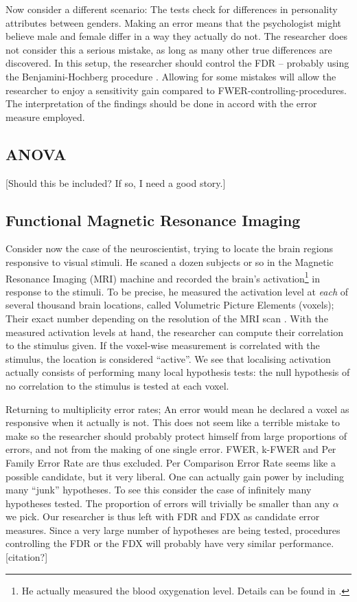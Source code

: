 \documentclass[review,12pt]{article}
\begin{document}
Now consider a different scenario: The tests check for differences in personality attributes between genders. Making an error means that the psychologist might believe male and female differ in a way they actually do not. The researcher does not consider this a serious mistake, as long as many other true differences are discovered. In this setup, the researcher should control the FDR -- probably using the Benjamini-Hochberg procedure \citep{benjamini_controlling_1995}. Allowing for some mistakes will allow the researcher to enjoy a sensitivity gain compared to FWER-controlling-procedures. The interpretation of the findings should be done in accord with the error measure employed.


\subsection{ANOVA}
[Should this be included? If so, I need a good story.]



\subsection{\label{sub:fMRI}Functional Magnetic Resonance Imaging}

Consider now the case of the neuroscientist, trying to locate the brain regions responsive to visual stimuli. He scaned a dozen subjects or so in the Magnetic Resonance Imaging (MRI) machine and recorded the brain's activation\footnote{ He actually measured the blood oxygenation level. Details can be found in \cite{lazar_statistical_2008}.} in response to the stimuli. To be precise, he measured the activation level at \emph{each} of several thousand brain locations, called Volumetric Picture Elements (voxels); Their exact number depending on the resolution of the MRI scan . With the measured activation levels at hand, the researcher can compute their correlation to the stimulus given. If the voxel-wise measurement is correlated with the stimulus, the location is considered ``active''. We see that localising activation actually consists of performing many local hypothesis tests: the null hypothesis of no correlation to the stimulus is tested at each voxel.

Returning to multiplicity error rates; An error would mean he declared a voxel as responsive when it actually is not. This does not seem like a terrible mistake to make so the researcher should probably protect himself from large proportions of errors, and not from the making of one single error. FWER, k-FWER and Per Family Error Rate are thus excluded. Per Comparison Error Rate seems like a possible candidate, but it very liberal. One can actually gain power by including many ``junk'' hypotheses. To see this consider the case of infinitely many hypotheses tested. The proportion of errors will trivially be smaller than any $\alpha$ we pick. Our researcher is thus left with FDR and FDX as candidate error measures. Since a very large number of hypotheses are being tested, procedures controlling the FDR or the FDX will probably have very similar performance. [citation?]
\end{document}

